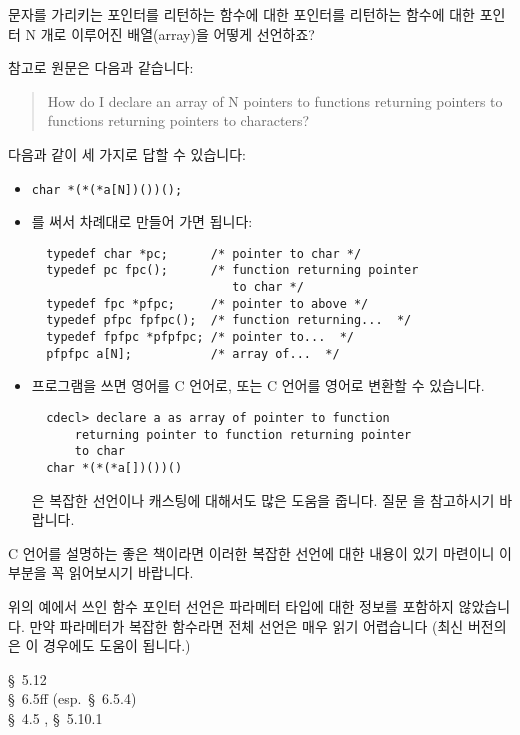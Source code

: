 \begin{faq}
	문자를 가리키는 포인터를 리턴하는 함수에 대한 포인터를 리턴하는
	함수에 대한 포인터 N 개로 이루어진 배열(array)을 어떻게 선언하죠?

\T
	참고로 원문은 다음과 같습니다:
\begin{quote}
	How do I declare an array of N pointers to functions returning
	pointers to functions returning pointers to characters?
\end{quote}

\A
	다음과 같이 세 가지로 답할 수 있습니다:

\begin{itemize}
	\item \verb+char *(*(*a[N])())();+
	\item {}를 써서 차례대로 만들어 가면 됩니다:
\begin{verbatim}
  typedef char *pc;      /* pointer to char */
  typedef pc fpc();      /* function returning pointer
                            to char */
  typedef fpc *pfpc;     /* pointer to above */
  typedef pfpc fpfpc();  /* function returning...  */
  typedef fpfpc *pfpfpc; /* pointer to...  */
  pfpfpc a[N];           /* array of...  */
\end{verbatim}

	\item {} 프로그램을 쓰면 영어를 C 언어로, 또는 C 언어를 영어로
	변환할 수 있습니다.

\begin{verbatim}
  cdecl> declare a as array of pointer to function
      returning pointer to function returning pointer
      to char
  char *(*(*a[])())()
\end{verbatim}

	\noindent {}은 복잡한 선언이나 캐스팅에 대해서도 많은 도움을
	줍니다.  질문 을 참고하시기 바랍니다.
\end{itemize}

	C 언어를 설명하는 좋은 책이라면 이러한 복잡한 선언에 대한 내용이 
	있기 마련이니 이 부분을 꼭 읽어보시기 바랍니다.

	위의 예에서 쓰인 함수 포인터 선언은 파라메터
	타입에 대한 정보를 포함하지 않았습니다.  만약 파라메터가 복잡한 
	함수라면 전체 선언은 매우 읽기 어렵습니다  
	(최신 버전의 은 이 경우에도 도움이 됩니다.)

\R 
	\cite{kr2} \S\ 5.12  \\
	\cite{c89} \S\ 6.5ff (esp.\ \S\ 6.5.4) \\
	\cite{hs} \S\ 4.5 , \S\ 5.10.1 
\end{faq}

